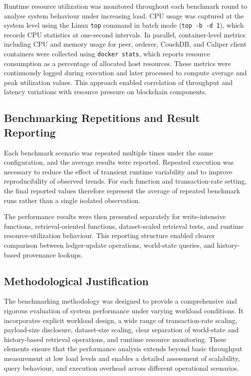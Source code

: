 \documentclass[12pt]{article}
\begin{document}
	Runtime resource utilization was monitored throughout each benchmark round to analyse system behaviour under increasing load. CPU usage was captured at the system level using the Linux \texttt{top} command in batch mode (\texttt{top -b -d 1}), which records CPU statistics at one-second intervals. In parallel, container-level metrics including CPU and memory usage for peer, orderer, CouchDB, and Caliper client containers were collected using \texttt{docker stats}, which reports resource consumption as a percentage of allocated host resources. These metrics were continuously logged during execution and later processed to compute average and peak utilization values. This approach enabled correlation of throughput and latency variations with resource pressure on blockchain components.
	
	
	\subsection{Benchmarking Repetitions and Result Reporting}
	
	Each benchmark scenario was repeated multiple times under the same configuration, and the average results were reported. Repeated execution was necessary to reduce the effect of transient runtime variability and to improve reproducibility of observed trends. For each function and transaction-rate setting, the final reported values therefore represent the average of repeated benchmark runs rather than a single isolated observation.
	
	The performance results were then presented separately for write-intensive functions, retrieval-oriented functions, dataset-scaled retrieval tests, and runtime resource-utilization behaviour. This reporting structure enabled clearer comparison between ledger-update operations, world-state queries, and history-based provenance lookups.
	
	\subsection{Methodological Justification}
	
	The benchmarking methodology was designed to provide a comprehensive and rigorous evaluation of system performance under varying workload conditions. It incorporates explicit workload design, a wide range of transaction-rate scaling, payload-size disclosure, dataset-size scaling, clear separation of world-state and history-based retrieval operations, and runtime resource monitoring. These elements ensure that the performance analysis extends beyond basic throughput measurement at low load levels and enables a detailed assessment of scalability, query behaviour, and execution overhead across different operational scenarios.
	
\end{document}
